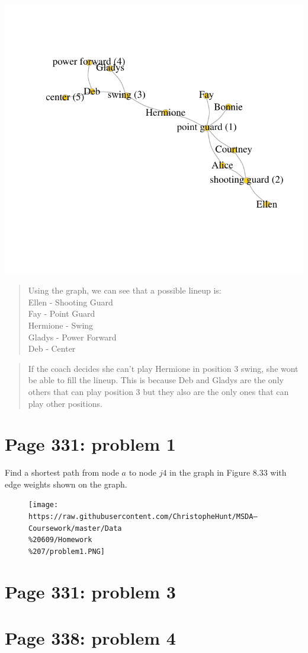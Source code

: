 \documentclass[]{article}
\begin{document}
\includegraphics{Christophe_Hunt_hw7_files/figure-latex/unnamed-chunk-2-1.pdf}

\begin{quote}
Using the graph, we can see that a possible lineup is:\\
Ellen - Shooting Guard\\
Fay - Point Guard\\
Hermione - Swing\\
Gladys - Power Forward\\
Deb - Center
\end{quote}

\begin{quote}
If the coach decides she can't play Hermione in position 3 swing, she
wont be able to fill the lineup. This is because Deb and Gladys are the
only others that can play position 3 but they also are the only ones
that can play other positions.
\end{quote}

\section{Page 331: problem 1}\label{page-331-problem-1}

Find a shortest path from node \(a\) to node \(j4\) in the graph in
Figure 8.33 with edge weights shown on the graph.

\begin{figure}[htbp]
\centering
\texttt{[image: https://raw.githubusercontent.com/ChristopheHunt/MSDA---Coursework/master/Data\\\%20609/Homework\\\%207/problem1.PNG]}
\caption{}
\end{figure}

\section{Page 331: problem 3}\label{page-331-problem-3}

\section{Page 338: problem 4}\label{page-338-problem-4}
\end{document}
